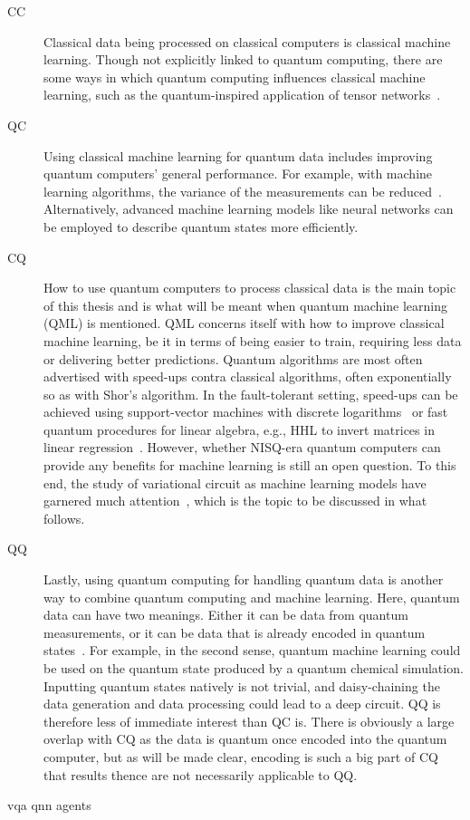 \begin{description}
    \item[CC]
        Classical data being processed on classical computers is classical machine learning.
        Though not explicitly linked to quantum computing, there are some ways in which quantum computing influences classical machine learning, such as the quantum-inspired application of tensor networks~\autocite{felser2021}.

    \item[QC]
        Using classical machine learning for quantum data includes improving quantum computers' general performance.
        For example, with machine learning algorithms, the variance of the measurements can be reduced~\autocite{torlai2020}.
        Alternatively, advanced machine learning models like neural networks can be employed to describe quantum states more efficiently.


    \item[CQ]
        How to use quantum computers to process classical data is the main topic of this thesis and is what will be meant when quantum machine learning (QML) is mentioned.
        QML concerns itself with how to improve classical machine learning, be it in terms of being easier to train, requiring less data or delivering better predictions.
        Quantum algorithms are most often advertised with speed-ups contra classical algorithms, often exponentially so as with Shor's algorithm.
        In the fault-tolerant setting, speed-ups can be achieved using support-vector machines with discrete logarithms~\autocite{liu2021} or fast quantum procedures for linear algebra, e.g., HHL to invert matrices in linear regression~\autocite{wiebe2012}.
        However, whether NISQ-era quantum computers can provide any benefits for machine learning is still an open question.
        To this end, the study of variational circuit as machine learning models have garnered much attention~\autocite{benedetti2019}, which is the topic to be discussed in what follows.

    \item[QQ]
        Lastly, using quantum computing for handling quantum data is another way to combine quantum computing and machine learning.
        Here, quantum data can have two meanings.
        Either it can be data from quantum measurements, or it can be data that is already encoded in quantum states~\autocite{schuld2021a}.
        For example, in the second sense, quantum machine learning could be used on the quantum state produced by a quantum chemical simulation.
        Inputting quantum states natively is not trivial, and daisy-chaining the data generation and data processing could lead to a deep circuit.
        QQ is therefore less of immediate interest than QC is.
        There is obviously a large overlap with CQ as the data is quantum once encoded into the quantum computer, but as will be made clear, encoding is such a big part of CQ that results thence are not necessarily applicable to QQ.

\end{description}


{vqa}
{qnn}
{agents}